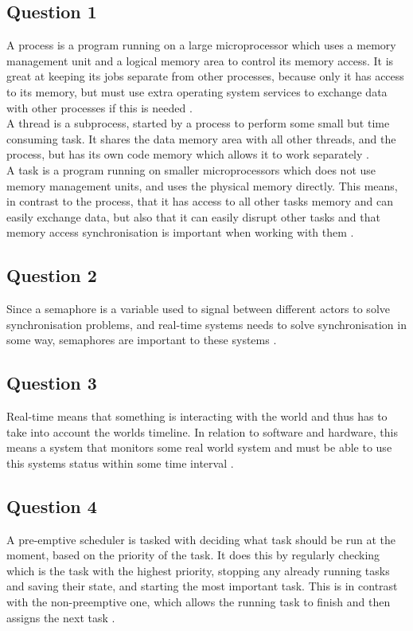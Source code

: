 \documentclass[12pt, A4paper, english]{book}
\begin{document}
			\subsection{Question 1}
A process is a program running on a large microprocessor which uses a memory management unit and a logical memory area to control its memory access. It is great at keeping its jobs separate from other processes, because only it has access to its memory, but must use extra operating system services to exchange data with other processes if this is needed \cite{LN}. \\
A thread is a subprocess, started by a process to perform some small but time consuming task. It shares the data memory area with all other threads, and the process, but has its own code memory which allows it to work separately \cite{LN}. \\
A task is a program running on smaller microprocessors which does not use memory management units, and uses the physical memory directly. This means, in contrast to the process, that it has access to all other tasks memory and can easily exchange data, but also that it can easily disrupt other tasks and that memory access synchronisation is important when working with them \cite{LN}.
		
			\subsection{Question 2}
Since a semaphore is a variable used to signal between different actors to solve synchronisation problems, and real-time systems needs to solve synchronisation in some way, semaphores are important to these systems \cite{LN}.
		
			\subsection{Question 3}
Real-time means that something is interacting with the world and thus has to take into account the worlds timeline. In relation to software and hardware, this means a system that monitors some real world system and must be able to use this systems status within some time interval \cite{LN}.
		
			\subsection{Question 4}
A pre-emptive scheduler is tasked with deciding what task should be run at the moment, based on the priority of the task. It does this by regularly checking which is the task with the highest priority, stopping any already running tasks and saving their state, and starting the most important task. This is in contrast with the non-preemptive one, which allows the running task to finish and then assigns the next task \cite{LN}.
		
\end{document}
